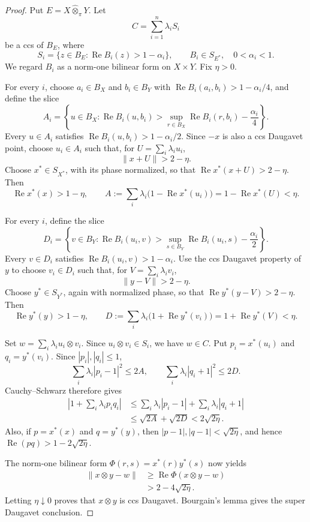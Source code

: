 \documentclass[11pt]{article}
\theoremstyle{definition}
\newcommand{\whotpi}{\widehat{\otimes}_{\pi}}
\newcommand{\Ree}{\operatorname{Re}}
\begin{document}
\begin{proof}
Put $E=X\whotpi Y$.  Let
\[
 C=\sum_{i=1}^n\lambda_iS_i
\]
be a ccs of $B_E$, where
\[
 S_i=\{z\in B_E:\Ree B_i(z)>1-\alpha_i\},
 \qquad B_i\in S_{E^*},\quad 0<\alpha_i<1.
\]
We regard $B_i$ as a norm-one bilinear form on $X\times Y$.  Fix $\eta>0$.

For every $i$, choose $a_i\in B_X$ and $b_i\in B_Y$ with
$\Ree B_i(a_i,b_i)>1-\alpha_i/4$, and define the slice
\[
 A_i=\left\{u\in B_X:
 \Ree B_i(u,b_i)>\sup_{r\in B_X}\Ree B_i(r,b_i)-\frac{\alpha_i}{4}\right\}.
\]
Every $u\in A_i$ satisfies $\Ree B_i(u,b_i)>1-\alpha_i/2$.
Since $-x$ is also a ccs Daugavet point, choose $u_i\in A_i$ such that, for
$U=\sum_i\lambda_i u_i$,
\[
       \|x+U\|>2-\eta.
\]
Choose $x^*\in S_{X^*}$, with its phase normalized, so that
$\Ree x^*(x+U)>2-\eta$.  Then
\[
 \Ree x^*(x)>1-\eta,
 \qquad
 A:=\sum_i\lambda_i\bigl(1-\Ree x^*(u_i)\bigr)
   =1-\Ree x^*(U)<\eta.
\]

For every $i$, define the slice
\[
 D_i=\left\{v\in B_Y:
 \Ree B_i(u_i,v)>\sup_{s\in B_Y}\Ree B_i(u_i,s)-\frac{\alpha_i}{2}\right\}.
\]
Every $v\in D_i$ satisfies $\Ree B_i(u_i,v)>1-\alpha_i$.  Use the ccs
Daugavet property of $y$ to choose $v_i\in D_i$ such that, for
$V=\sum_i\lambda_i v_i$,
\[
       \|y-V\|>2-\eta.
\]
Choose $y^*\in S_{Y^*}$, again with normalized phase, so that
$\Ree y^*(y-V)>2-\eta$.  Then
\[
 \Ree y^*(y)>1-\eta,
 \qquad
 D:=\sum_i\lambda_i\bigl(1+\Ree y^*(v_i)\bigr)
   =1+\Ree y^*(V)<\eta.
\]

Set $w=\sum_i\lambda_i u_i\otimes v_i$.  Since
$u_i\otimes v_i\in S_i$, we have $w\in C$.  Put
$p_i=x^*(u_i)$ and $q_i=y^*(v_i)$.  Since $|p_i|,|q_i|\le1$,
\[
 \sum_i\lambda_i|p_i-1|^2\le2A,
 \qquad
 \sum_i\lambda_i|q_i+1|^2\le2D.
\]
Cauchy--Schwarz therefore gives
\begin{align*}
 \left|1+\sum_i\lambda_i p_iq_i\right|
 &\le \sum_i\lambda_i|p_i-1|+
       \sum_i\lambda_i|q_i+1|\\
 &\le \sqrt{2A}+\sqrt{2D}<2\sqrt{2\eta}.
\end{align*}
Also, if $p=x^*(x)$ and $q=y^*(y)$, then
$|p-1|,|q-1|<\sqrt{2\eta}$, and hence
$\Ree(pq)>1-2\sqrt{2\eta}$.

The norm-one bilinear form $\Phi(r,s)=x^*(r)y^*(s)$ now yields
\begin{align*}
 \|x\otimes y-w\|
 &\ge \Ree\Phi(x\otimes y-w)\\
 &>2-4\sqrt{2\eta}.
\end{align*}
Letting $\eta\downarrow0$ proves that $x\otimes y$ is ccs Daugavet.
Bourgain's lemma gives the super Daugavet conclusion.
\end{proof}
\end{document}
